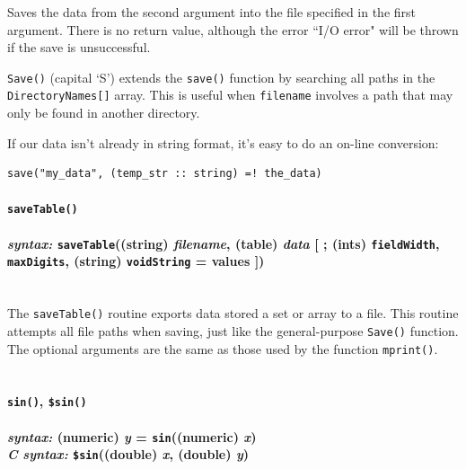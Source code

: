 \documentclass{article}
\newenvironment{code}{
       \begin{list}{}{
               \setlength{\leftmargin}{.4in}
               \setlength{\rightmargin}{0in}
               \setlength{\topsep}{.2in}
       }
       \small
       \item[] }
       { \end{list}   }
\begin{document}
Saves the data from the second argument into the file specified in the first argument.  There is no return value, although the error ``I/O error" will be thrown if the save is unsuccessful.

\texttt{Save()} (capital `S') extends the \texttt{save()} function by searching all paths in the \texttt{DirectoryNames[]} array.  This is useful when \verb#filename# involves a path that may only be found in another directory.

If our data isn't already in string format, it's easy to do an on-line conversion:

\begin{code} \begin{verbatim}
save("my_data", (temp_str :: string) =! the_data)
\end{verbatim} \end{code}

 





\paragraph{\texttt{saveTable()}\\\\
\normalfont \emph{syntax: } \texttt{saveTable}((string) \emph{filename}, (table) \emph{data} [ ; (ints) \texttt{fieldWidth}, \texttt{maxDigits}, (string) \texttt{voidString} = values ])\\\\}

The \texttt{saveTable()} routine exports data stored a set or array to a file.  This routine attempts all file paths when saving, just like the general-purpose \verb#Save()# function.  The optional arguments are the same as those used by the function \texttt{mprint()}.\\\\





\paragraph{\texttt{sin()}, \texttt{\$sin()}\\\\
\normalfont \emph{syntax: } (numeric) \emph{y} = \texttt{sin}((numeric) \emph{x})\\
\normalfont \emph{C syntax: } \texttt{\$sin}((double) \emph{x}, (double) \emph{y})\\\\}
\end{document}
